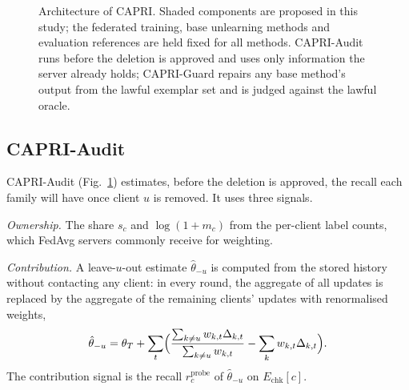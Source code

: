 \documentclass[pdflatex,sn-mathphys-num,iicol]{sn-jnl}
\newcommand{\Efit}{E_{\mathrm{fit}}}
\newcommand{\Echk}{E_{\mathrm{chk}}}
\newcommand{\DD}{\mathrm{DD}_{\rho}}
\newcommand{\rprobe}{r^{\mathrm{probe}}_c}
\begin{document}
\begin{figure}[t]
\caption{Architecture of CAPRI. Shaded components are proposed in this study; the federated training, base unlearning methods and evaluation references are held fixed for all methods. CAPRI-Audit runs before the deletion is approved and uses only information the server already holds; CAPRI-Guard repairs any base method's output from the lawful exemplar set and is judged against the lawful oracle.}\label{fig:arch}
\end{figure}

\subsection{CAPRI-Audit}\label{sec:audit}

CAPRI-Audit (Fig.~\ref{fig:arch}) estimates, before the deletion is approved, the recall each family will have once client $u$ is removed. It uses three signals.

\emph{Ownership.} The share $s_c$ and $\log(1+m_c)$ from the per-client label counts, which FedAvg servers commonly receive for weighting.

\emph{Contribution.} A leave-$u$-out estimate $\hat\theta_{-u}$ is computed from the stored history without contacting any client: in every round, the aggregate of all updates is replaced by the aggregate of the remaining clients' updates with renormalised weights,
\begin{equation}\label{eq:loo}
\hat\theta_{-u}=\theta_T+\sum_{t}\Bigl(\frac{\sum_{k\neq u}w_{k,t}\Delta_{k,t}}{\sum_{k\neq u}w_{k,t}}-\sum_{k}w_{k,t}\Delta_{k,t}\Bigr).
\end{equation}
The contribution signal is the recall $\rprobe$ of $\hat\theta_{-u}$ on $\Echk[c]$.
\end{document}
